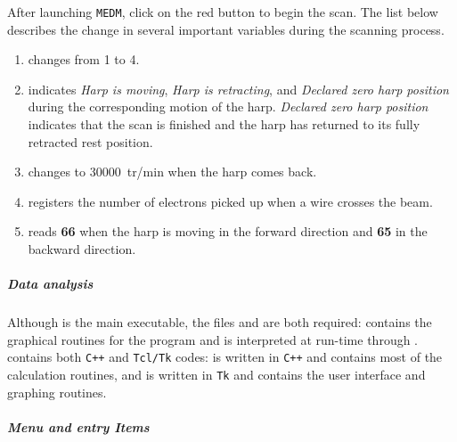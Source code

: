After launching {\tt MEDM}, click on the red {\bf{}} button to begin the scan. The list
below describes the  change in several important variables during the scanning process.
\begin{enumerate}
\item {} changes from 1 to 4.
\item {} indicates {\it Harp is moving}, {\it Harp is retracting}, and
	{\it Declared zero harp position} during the corresponding motion of the harp.
	{\it Declared zero harp position} indicates that the scan is finished and the harp has
	returned to its fully retracted rest position.
\item {} changes to 30000~tr/min when the harp comes back.
\item {} registers the number of electrons picked up when a wire crosses the beam.
\item {} reads {\bf 66} when the harp is moving in the forward direction
	and {\bf 65} in the backward direction.
\end{enumerate}


	\subparagraph{Data analysis}\label{analysis}

Although  is the main executable, the files 
and  are both required:  contains the graphical routines
for the program and is interpreted at run-time through .  contains
both {\tt C++} and {\tt Tcl/Tk} codes:  is written in {\tt C++} and contains most
of the calculation routines, and  is written in {\tt Tk} and contains the user
interface and graphing routines.

	\subparagraph{Menu and entry Items}

